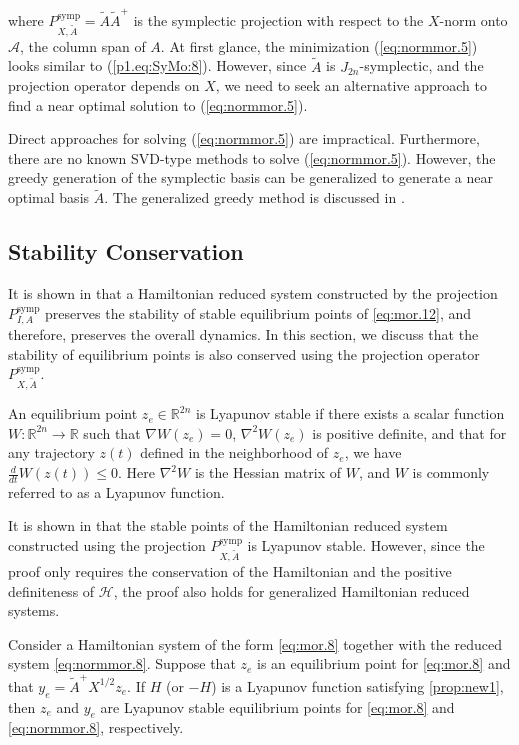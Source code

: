where $P^\text{symp}_{X,\tilde A} = \tilde A \tilde A^+$ is the symplectic projection with respect to the $X$-norm onto $\mathcal A$, the column span of $A$. At first glance, the minimization (\ref{eq:normmor.5}) looks similar to (\ref{p1.eq:SyMo:8}). However, since $\tilde A$ is $J_{2n}$-symplectic, and the projection operator depends on $X$, we need to seek an alternative approach to find a near optimal solution to (\ref{eq:normmor.5}). 

Direct approaches for solving (\ref{eq:normmor.5}) are impractical. Furthermore, there are no known SVD-type methods to solve (\ref{eq:normmor.5}). However, the greedy generation of the symplectic basis can be generalized to generate a near optimal basis $\tilde A$. The generalized greedy method is discussed in .

\subsection{Stability Conservation} It is shown in \cite{doi:10.1137/140978922,doi:10.1137/17M1111991} that a Hamiltonian reduced system constructed by the projection $P^{\text{symp}}_{I,A}$ preserves the stability of stable equilibrium points of \cref{eq:mor.12}, and therefore, preserves the overall dynamics. In this section, we discuss that the stability of equilibrium points is also conserved using the projection operator $P^{\text{symp}}_{X,\tilde A}$.

\begin{proposition} \label{prop:new1}
\cite{bhatia2002stability} An equilibrium point $z_e\in \mathbb R^{2n}$ is Lyapunov stable if there exists a scalar function $W:\mathbb R^{2n} \to \mathbb R$ such that $\nabla W(z_e) = 0$, $\nabla^2 W(z_e)$ is positive definite, and that for any trajectory $z(t)$ defined in the neighborhood of $z_e$, we have $\frac{d}{dt} W(z(t))\leq 0$. Here $\nabla^2 W$ is the Hessian matrix of $W$, and $W$ is commonly referred to as a Lyapunov function.
\end{proposition}

It is shown in \cite{doi:10.1137/17M1111991} that the stable points of the Hamiltonian reduced system constructed using the projection $P^{\text{symp}}_{X,\tilde A}$ is Lyapunov stable. However, since the proof only requires the conservation of the Hamiltonian and the positive definiteness of $\mathcal H$, the proof also holds for generalized Hamiltonian reduced systems.

\begin{theorem}
\cite{doi:10.1137/17M1111991} Consider a Hamiltonian system of the form \cref{eq:mor.8} together with the reduced system \cref{eq:normmor.8}. Suppose that $z_e$ is an equilibrium point for \cref{eq:mor.8} and that $y_e = \tilde A ^+ X^{1/2} z_e$. If $H$ (or $-H$) is a Lyapunov function satisfying \cref{prop:new1}, then $z_e$ and $y_e$ are Lyapunov stable equilibrium points for \cref{eq:mor.8} and \cref{eq:normmor.8}, respectively.
\end{theorem}


